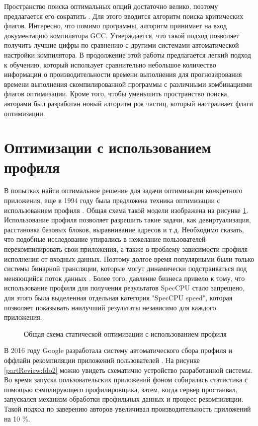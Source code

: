 Пространство поиска оптимальных опций достаточно велико, поэтому предлагается его сократить \cite{zhu2023compiler}. Для этого вводится алгоритм поиска критических флагов. Интересно, что помимо программы, алгоритм принимает на вход документацию компилятора GCC. Утверждается, что такой подход позволяет получить лучшие цифры по сравнению с другими системами автоматической настройки компилятора.  В продолжение этой работы \cite{zhu2024compiler} предлагается легкий подход к обучению, который использует сравнительно небольшое количество информации о производительности времени выполнения для прогнозирования времени выполнения скомпилированной программы с различными комбинациями флагов оптимизации. Кроме того, чтобы уменьшить пространство поиска, авторами был разработан новый алгоритм роя частиц, который настраивает флаги оптимизации.


\section{Оптимизации с использованием профиля} \label{pr:pgo}
В попытках  найти оптимальное решение для задачи оптимизации конкретного приложения, еще в 1994 году была предложена техника оптимизации с использованием профиля \cite{liew1994feedback}. Общая схема такой модели изображена на рисунке \ref{partReview:fdo11}. Использование профиля позволяет разрешить такие задачи, как девиртуализация, расстановка базовых блоков, выравнивание адресов и т.д. Необходимо сказать, что подобные исследование упирались в нежелание пользователей перекомпилировать свои приложения, а также в проблему зависимости профиля исполнения от входных данных. Поэтому долгое  время популярными были только системы бинарной трансляции, которые могут динамически подстраиваться под меняющийся поток данных \cite{dange2014systematic}. Более того, давление бизнеса привело к тому, что использование профиля для получения результатов SpecCPU стало запрещено, для этого была выделенная отдельная категория "SpecCPU speed"\phantom{}, которая позволяет показывать наилучший результаты независимо для каждого приложения.
 \begin{figure}[htbp]
	\centering
	
	\caption{Общая схема статической оптимизации с использованием профиля}
	\label{partReview:fdo11}
\end{figure}

В 2016 году Google разработала систему автоматического сбора профиля и оффлайн рекомпиляции приложений пользователей \cite{chen2016autofdo}. На рисунке \ref{partReview:fdo2} можно увидеть схематично устройство разработанной системы. Во время запуска пользовательских приложений фоном собиралась статистика с помощью сэмплирующего профилировщика, затем, когда сервер простаивал, запускался механизм обработки профильных данных и процесс рекомпиляции. Такой подход по заверению авторов увеличивал производительность приложений на 10 \%.  

